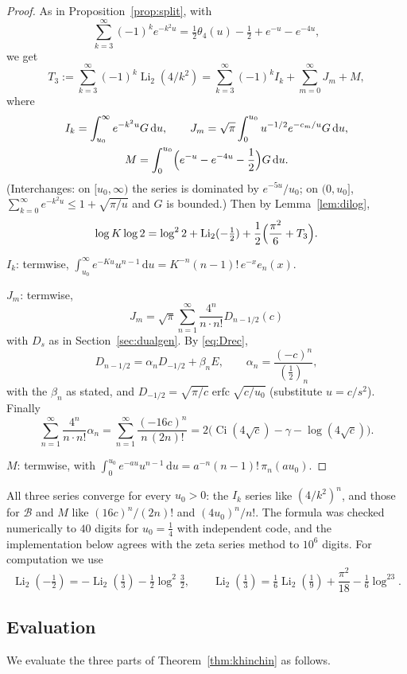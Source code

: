 \documentclass[11pt]{amsart}
\theoremstyle{definition}
\theoremstyle{remark}
\newcommand{\erfc}{\operatorname{erfc}}
\newcommand{\Ci}{\operatorname{Ci}}
\newcommand{\Li}{\operatorname{Li}}
\newcommand{\dd}{\,\mathrm{d}}
\begin{document}
\begin{proof}
As in Proposition~\ref{prop:split}, with
\[
  \sum_{k=3}^{\infty}(-1)^ke^{-k^2u} = \tfrac12\theta_4(u) - \tfrac12 + e^{-u} - e^{-4u},
\]
we get
\[
  T_3 := \sum_{k=3}^{\infty}(-1)^k\Li_2(4/k^2) = \sum_{k=3}^{\infty}(-1)^k I_k + \sum_{m=0}^{\infty} J_m + M,
\]
where
\begin{gather*}
  I_k = \int_{u_0}^\infty e^{-k^2u}G\dd u, \qquad J_m = \sqrt\pi\int_0^{u_0}u^{-1/2}e^{-c_m/u}G\dd u, \\
  M = \int_0^{u_0}\Bigl(e^{-u} - e^{-4u} - \frac12\Bigr)G\dd u.
\end{gather*}
(Interchanges: on $[u_0,\infty)$ the series is dominated by
$e^{-5u}/u_0$; on $(0,u_0]$, $\sum_{k=0}^{\infty} e^{-k^2u} \le 1 + \sqrt{\pi/u}$ and $G$ is bounded.) Then
by Lemma~\ref{lem:dilog},
\[
  \log K\log2 = \log^22 + \Li_2(-\tfrac12) + \frac12\Bigl(\frac{\pi^2}6 + T_3\Bigr).
\]

$I_k$: termwise, $\int_{u_0}^\infty e^{-Ku}u^{n-1}\dd u = K^{-n}(n-1)!\,e^{-x}e_n(x)$.

$J_m$: termwise,
\[
  J_m = \sqrt\pi\sum_{n=1}^{\infty} \frac{4^n}{n\cdot n!}D_{n-1/2}(c)
\]
with $D_s$ as in Section~\ref{sec:dualgen}. By \eqref{eq:Drec},
\[
  D_{n-1/2} = \alpha_n D_{-1/2} + \beta_n E, \qquad \alpha_n = \frac{(-c)^n}{(\frac12)_n},
\]
with the $\beta_n$ as stated, and $D_{-1/2} = \sqrt{\pi/c}\erfc\sqrt{c/u_0}$ (substitute $u = c/s^2$). Finally
\[
  \sum_{n=1}^{\infty} \frac{4^n}{n\cdot n!}\alpha_n = \sum_{n=1}^{\infty}\frac{(-16c)^n}{n\,(2n)!} = 2\bigl(\Ci(4\sqrt c) - \gamma - \log(4\sqrt c)\bigr).
\]

$M$: termwise, with $\int_0^{u_0}e^{-au}u^{n-1}\dd u = a^{-n}(n-1)!\,\pi_n(au_0)$.
\end{proof}

All three series converge for every $u_0 > 0$: the $I_k$ series like $(4/k^2)^n$, and those for
$\mathcal B$ and $M$ like $(16c)^n/(2n)!$ and $(4u_0)^n/n!$. The formula was checked numerically to
$40$ digits for $u_0 = \frac14$ with independent code, and the implementation below agrees with the zeta
series method to $10^6$ digits. For computation we use
\[
  \Li_2(-\tfrac12) = -\Li_2(\tfrac13) - \tfrac12\log^2\tfrac32, \qquad
  \Li_2(\tfrac13) = \tfrac16\Li_2(\tfrac19) + \frac{\pi^2}{18} - \tfrac16\log^23.
\]

\subsection{Evaluation}\label{sec:kheval}
We evaluate the three parts of Theorem~\ref{thm:khinchin} as follows.
\end{document}
